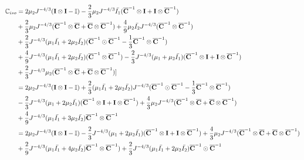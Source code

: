 \begin{equation} \label{mCiso}
\begin{split}
\mathbb{C}_{iso} 
&= 
2\mu_2{J}^{-4/3}(\bold{I} \otimes \bold{I} - \mathbb{I}) - \frac{2}{3}\mu_2J^{-4/3}\bar{I_1}({\overline{\bold{C}}}^{-1} \otimes \bold{I} + \bold{I} \otimes {\overline{\bold{C}}}^{-1}) \\
&+
\frac{2}{3}\mu_2J^{-4/3}({\overline{\bold{C}}}^{-1} \otimes {\overline{\bold{C}}} + {\overline{\bold{C}}} \otimes {\overline{\bold{C}}}^{-1}) + \frac{4}{9}\mu_2\bar{I_2}J^{-4/3}({\overline{\bold{C}}}^{-1} \otimes {\overline{\bold{C}}}^{-1}) \\
&+
\frac{2}{3}J^{-4/3}(\mu_1\bar{I_1} + 2\mu_2\bar{I_2})({\overline{\bold{C}}}^{-1} \odot {{\overline{\bold{C}}}}^{-1} - \frac{1}{3}{{\overline{\bold{C}}}}^{-1} \otimes {\overline{{\bold{C}}}}^{-1}) \\
&+
\frac{4}{9}J^{-4/3} (\mu_1\bar{I_1} + 2\mu_2\bar{I_2})({\overline{\bold{C}}}^{-1} \otimes {\overline{\bold{C}}}^{-1}) - \frac{2}{3}J^{-4/3}(\mu_1+\mu_2\bar{I_1})({\overline{\bold{C}}}^{-1} \otimes \bold{I} + \bold{I} \otimes {\overline{\bold{C}}}^{-1})\\
&+ \frac{2}{3}J^{-4/3}\mu_2({\overline{\bold{C}}}^{-1} \otimes {\overline{\bold{C}}}+{\overline{\bold{C}}} \otimes {\overline{\bold{C}}}^{-1}) ] \\
&=
2\mu_2{J}^{-4/3}(\bold{I} \otimes \bold{I} - \mathbb{I}) + \frac{2}{3}(\mu_1\bar{I_1} + 2\mu_2\bar{I_2})J^{-4/3}({\overline{\bold{C}}}^{-1} \odot {\overline{\bold{C}}}^{-1} - \frac{1}{3}{\overline{\bold{C}}}^{-1} \otimes {\overline{\bold{C}}}^{-1}) \\
&-
\frac{2}{3}J^{-4/3}(\mu_1 + 2\mu_2\bar{I_1})({\overline{\bold{C}}}^{-1} \otimes \bold{I} + \bold{I} \otimes {\overline{\bold{C}}}^{-1}) + \frac{4}{3}\mu_2J^{-4/3}({\overline{\bold{C}}}^{-1} \otimes {\overline{\bold{C}}} + {\overline{\bold{C}}} \otimes {\overline{\bold{C}}}^{-1}) \\
&+
\frac{4}{9}J^{-4/3}(\mu_1\bar{I_1} + 3\mu_2\bar{I_2}){\overline{\bold{C}}}^{-1} \otimes {\overline{\bold{C}}}^{-1} \\
&=
2\mu_2{J}^{-4/3}(\bold{I} \otimes \bold{I} - \mathbb{I}) - \frac{2}{3}J^{-4/3}(\mu_1 + 2\mu_2\bar{I_1})({\overline{\bold{C}}}^{-1} \otimes \bold{I} + \bold{I} \otimes {\overline{\bold{C}}}^{-1}) + \frac{4}{3}\mu_2J^{-4/3}({\overline{\bold{C}}}^{-1} \otimes {\overline{\bold{C}}} + {\overline{\bold{C}}} \otimes {\overline{\bold{C}}}^{-1}) \\
&+
\frac{2}{9}J^{-4/3}(\mu_1\bar{I_1} + 4\mu_2\bar{I_2}) {\overline{\bold{C}}}^{-1} \otimes {\overline{\bold{C}}}^{-1}) + \frac{2}{3}J^{-4/3}(\mu_1\bar{I_1} + 2\mu_2\bar{I_2}){\overline{\bold{C}}}^{-1} \odot {\overline{\bold{C}}}^{-1} 
\end{split}
\end{equation} 









